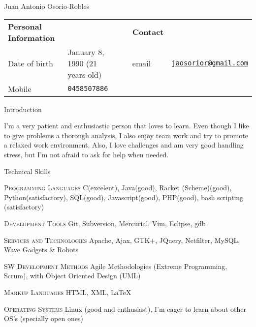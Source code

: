 \documentclass[spanish,10pt,letterpaper]{article}
\begin{document}
\centering
\begin{cv}{Juan Antonio Osorio-Robles}


	\begin{table}[h]
		\begin{tabular}{@{} l l p{0.5cm} l r}
			{\bf Personal Information}	&	&	&	{\bf Contact}	&	\\
			Date of birth &	January 8, 1990 (21 years old)	&	&
			email	&	\href{mailto:jaosorior@gmail.com}	{\tt jaosorior@gmail.com}	\\
			Mobile &	{\tt 0458507886}
		\end{tabular}
	\end{table}

	\begin{cvlist}{Introduction}
		\item[	]
			I'm a very patient and enthusiastic person that loves to learn. Even though I like to give problems a thorough analysis, I also enjoy team work and try to promote a relaxed work environment. Also, I love challenges and am very good handling stress, but I'm not afraid to ask for help when needed.
	\end{cvlist}

	
	\begin{cvlist}{Technical Skills}
			\item [\textsc{Programming Languages}]
				C(excelent), Java(good), Racket (Scheme)(good), Python(satisfactory), SQL(good), Javascript(good), PHP(good), bash scripting (satisfactory)
			\item [\textsc{Development Tools}]
				Git, Subversion, Mercurial, Vim, Eclipse, gdb
			\item [\textsc {Services and Technologies}]
				Apache, Ajax, GTK+, JQuery, Netfilter, MySQL, Wave Gadgets \& Robots
			\item [\textsc {SW Development Methods}]
				Agile Methodologies (Extreme Programming, Scrum), with Object Oriented Design (UML)
			\item [\textsc {Markup Languages}]
				HTML, XML,
				\LaTeX
			\item [\textsc {Operating Systems}]
				Linux (good and enthusiast), I'm eager to learn about other OS's (specially open ones)
	\end{cvlist}


\end{cv}
\end{document}
